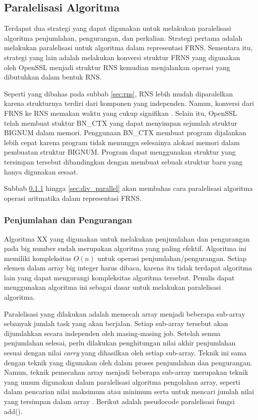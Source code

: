 \subsection{Paralelisasi Algoritma}
Terdapat dua strategi yang dapat digunakan untuk melakukan paralelisasi algoritma penjumlahan, pengurangan, dan perkalian. Strategi pertama adalah melakukan paralelisasi untuk algoritma dalam representasi FRNS. Sementara itu, strategi yang lain adalah melakukan konversi struktur FRNS yang digunakan oleh OpenSSL menjadi struktur RNS kemudian menjalankan operasi yang dibutuhkan dalam bentuk RNS.

Seperti yang dibahas pada subbab \ref{sec:rns}, RNS lebih mudah diparalelkan karena strukturnya terdiri dari komponen yang independen. Namun, konversi dari FRNS ke RNS memakan waktu yang cukup signifikan . Selain itu, OpenSSL telah membuat stuktur BN\_CTX yang dapat menyimpan sejumlah struktur BIGNUM dalam memori. Penggunaan BN\_CTX membuat program dijalankan lebih cepat karena program tidak menunggu selesainya alokasi memori dalam pembuatan struktur BIGNUM. Program dapat menggunakan struktur yang tersimpan tersebut dibandingkan dengan membuat sebuah struktur baru yang hanya digunakan sesaat.

Subbab \ref{sec:add_sub_parallel} hingga \ref{sec:div_parallel} akan membahas cara paralelisasi algoritma operasi aritmatika dalam representasi FRNS.

\subsubsection{Penjumlahan dan Pengurangan}\label{sec:add_sub_parallel}
Algoritma XX  yang digunakan untuk melakukan penjumlahan dan pengurangan pada big number sudah merupakan algoritma yang paling efektif. Algoritma ini memiliki kompleksitas $O(n)$ untuk operasi penjumlahan/pengurangan. Setiap elemen dalam array big integer harus dibaca, karena itu tidak terdapat algoritma lain yang dapat mengurangi kompleksitas algoritma tersebut. Penulis dapat menggunakan algoritma ini sebagai dasar untuk melakukan paralelisasi algoritma.


Paralelisasi yang dilakukan adalah memecah array menjadi beberapa sub-array sebanyak jumlah task yang akan berjalan. Setiap sub-array tersebut akan dijumlahkan secara independen oleh masing-masing job. Setelah semua penjumlahan selesai, perlu dilakukan penghitungan nilai akhir penjumlahan sesuai dengan nilai \textit{carry} yang dihasilkan oleh setiap sub-array. Teknik ini sama dengan teknik yang digunakan oleh \citet{gpu_bignum} dalam proses penjumlahan dan pengurangan. Namun, teknik pemecahan array menjadi beberapa sub-array merupakan teknik yang umum digunakan dalam paralelisasi algoritma pengolahan array, seperti dalam pencarian nilai maksimum atau minimum serta untuk mencari jumlah nilai yang tersimpan dalam array \citep{intro_parallel}. Berikut adalah pseudocode paralelisasi fungsi add().


